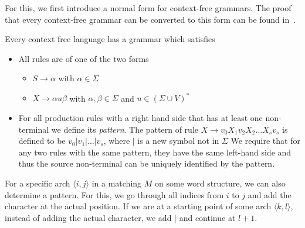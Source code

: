 For this, we first introduce a normal form for context-free grammars.
The proof that every context-free grammar can be converted to this form can be found in~\cite{Lautemann1995}.
\begin{lemma}
    Every context free language has a grammar which satisfies
    \begin{itemize}
        \setlength\itemsep{0.2em}
        \item All rules are of one of the two forms
        \begin{itemize}
            \setlength\itemsep{0.2em}
            \item $S \to \alpha$ with $\alpha \in \Sigma$
            \item $X \to \alpha u \beta$ with $\alpha, \beta \in \Sigma$ and $u \in (\Sigma \cup V)^{*}$
        \end{itemize}
        \item For all production rules with a right hand side that has at least one non-terminal we define its \emph{pattern}.
        The pattern of rule $X \to v_{0}X_{1}v_{2}X_{2}\dots X_{s}v_{s}$ is defined to be $v_{0}|v_{1}|\dots|v_{s}$, where $|$ is a new symbol not in $\Sigma$
        We require that for any two rules with the same pattern, they have the same left-hand side and thus the source non-terminal can be uniquely identified by the pattern.
    \end{itemize}
\end{lemma}

For a specific arch $\langle i, j \rangle$ in a matching $M$ on some word structure, we can also determine a pattern.
For this, we go through all indices from $i$ to $j$ and add the character at the actual position.
If we are at a starting point of some arch $\langle k, l \rangle$, instead of adding the actual character, we add $|$ and continue at $l + 1$.

